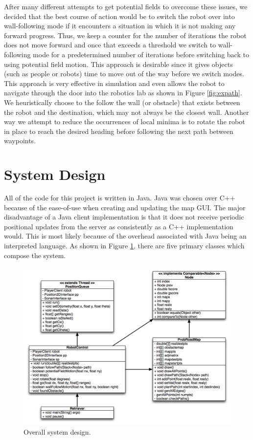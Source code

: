 \documentclass[12pt]{article}
\begin{document}
After many different attempts to get potential fields to overcome these issues, we decided that the best course of action would be to switch the robot over into wall-following mode if it encounters a situation in which it is not making any forward progress. Thus, we keep a counter for the number of iterations the robot does not move forward and once that exceeds a threshold we switch to wall-following mode for a predetermined number of iterations before switching back to using potential field motion. This approach is desirable since it gives objects (such as people or robots) time to move out of the way before we switch modes. This approach is very effective in simulation and even allows the robot to navigate through the door into the robotics lab as shown in Figure \ref{fig:expath}. We heuristically choose to the follow the wall (or obstacle) that exists between the robot and the destination, which may not always be the closest wall. Another way we attempt to reduce the occurrences of local minima is to rotate the robot in place to reach the desired heading before following the next path between waypoints.


\section{System Design}

All of the code for this project is written in Java. Java was chosen over C++ because of the ease-of-use when creating and updating the map GUI. The major disadvantage of a Java client implementation is that it does not receive periodic positional updates from the server as consistently as a C++ implementation would. This is most likely because of the overhead associated with Java being an interpreted language. As shown in Figure \ref{fig:uml}, there are five primary classes which compose the system.
 

\begin{figure}[H]
\centering
\includegraphics[scale=.6]{img/UML.jpg}
\caption{Overall system design.}
\label{fig:uml}
\end{figure}
\end{document}
